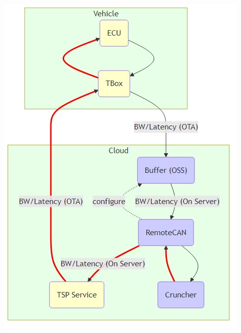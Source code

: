 \documentclass[a4paper, 11pt]{article}
\begin{document}
\begin{center}
\includegraphics[width=.9\linewidth]{./img/data_flow_cloud.png}
\label{Fig. Dataflow}
\end{center}
\end{document}
